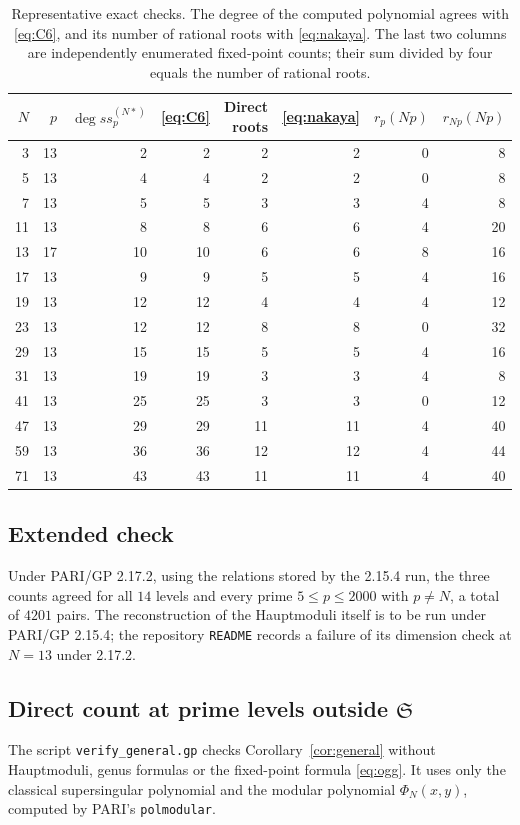 \documentclass[11pt,a4paper]{article}
\theoremstyle{remark}\newtheorem{remark}[theorem]{Remark}
\numberwithin{equation}{section}
\begin{document}
	\begin{table}[ht]
		\centering
		\caption{Representative exact checks. The degree of the computed polynomial agrees with \eqref{eq:C6}, and its number of rational roots with \eqref{eq:nakaya}. The last two columns are independently enumerated fixed-point counts; their sum divided by four equals the number of rational roots.}
		\label{tab:checks}
		\begin{tabular}{rrrrrrrr}\toprule
			$N$&$p$&$\deg ss_p^{(N*)}$&\eqref{eq:C6}&Direct roots&\eqref{eq:nakaya}&$r_p(Np)$&$r_{Np}(Np)$\\\midrule
			3 & 13 & 2 & 2 & 2 & 2 & 0 & 8 \\
			5 & 13 & 4 & 4 & 2 & 2 & 0 & 8 \\
			7 & 13 & 5 & 5 & 3 & 3 & 4 & 8 \\
			11 & 13 & 8 & 8 & 6 & 6 & 4 & 20 \\
			13 & 17 & 10 & 10 & 6 & 6 & 8 & 16 \\
			17 & 13 & 9 & 9 & 5 & 5 & 4 & 16 \\
			19 & 13 & 12 & 12 & 4 & 4 & 4 & 12 \\
			23 & 13 & 12 & 12 & 8 & 8 & 0 & 32 \\
			29 & 13 & 15 & 15 & 5 & 5 & 4 & 16 \\
			31 & 13 & 19 & 19 & 3 & 3 & 4 & 8 \\
			41 & 13 & 25 & 25 & 3 & 3 & 0 & 12 \\
			47 & 13 & 29 & 29 & 11 & 11 & 4 & 40 \\
			59 & 13 & 36 & 36 & 12 & 12 & 4 & 44 \\
			71 & 13 & 43 & 43 & 11 & 11 & 4 & 40 \\
			\bottomrule\end{tabular}
	\end{table}
	
	\subsection{Extended check}
	Under PARI/GP 2.17.2, using the relations stored by the 2.15.4 run, the three counts agreed for all $14$ levels and every prime $5\leq p\leq2000$ with $p\neq N$, a total of $4201$ pairs. The reconstruction of the Hauptmoduli itself is to be run under PARI/GP 2.15.4; the repository \texttt{README} records a failure of its dimension check at $N=13$ under 2.17.2.
	
	\subsection{Direct count at prime levels outside \texorpdfstring{$\mathfrak S$}{S}}\label{app:general}
	The script \texttt{verify\_general.gp} checks Corollary~\ref{cor:general} without Hauptmoduli, genus formulas or the fixed-point formula \eqref{eq:ogg}. It uses only the classical supersingular polynomial and the modular polynomial $\Phi_N(x,y)$, computed by PARI's \texttt{polmodular}.
	
\end{document}
